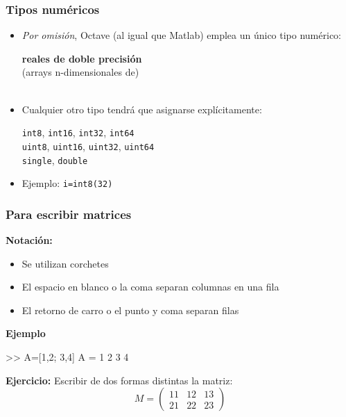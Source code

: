 

\hypertarget{tipos-num-ricos}{}
\begin{frame}[containsverbatim]
\frametitle{Tipos numéricos}

\begin{itemize}
\item 
  \emph{Por omisión}, Octave (al igual que Matlab) emplea un único
  tipo numérico: 
\begin{center}
  \Large
  \textbf{\alert{reales de doble precisión}}
  \\[0.5em]
  \normalsize
  (arrays n-dimensionales de)
  \\[0.4em]~
\end{center}


\item Cualquier otro tipo tendrá que asignarse explícitamente:
\begin{flushright}
  \verb|int8|, \verb|int16|, \verb|int32|, \verb|int64|
  \\
  \small \verb|uint8|, \verb|uint16|, \verb|uint32|, \verb|uint64|
  \\
  \verb|single|, \verb|double|
\end{flushright}

\item Ejemplo: \verb|i=int8(32)|
\end{itemize}
\end{frame}




\hypertarget{para-diferenciar-filas-y-columnas}{}
\begin{frame}[containsverbatim]
\frametitle{Para escribir matrices}

\textbf{Notación:}
\begin{itemize}
\item Se utilizan corchetes
\item El espacio en blanco o la coma separan columnas en una fila
\item El retorno de carro o el punto y coma separan filas
\end{itemize}

\textbf{Ejemplo} 
\begin{Octave}
>> A=[1,2; 3,4]
A =
   1   2
   3   4
\end{Octave}

\textbf{Ejercicio:} Escribir de dos formas distintas la matriz:
$$
M=\left(
\begin{array}{lll}
  11 & 12 & 13 \\
  21 & 22 & 23
\end{array}
\right)
$$
\end{frame}

